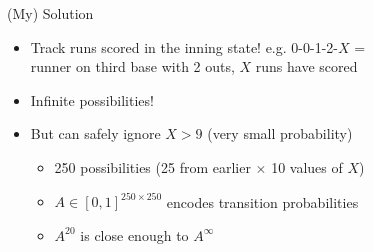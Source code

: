 \documentclass[handout]{beamer}
\begin{document}
\begin{frame}{(My) Solution}
  \begin{itemize}
    \item Track runs scored in the inning state! e.g. 0-0-1-2-$X$ =\\
      runner on third base with 2 outs, $X$ runs have scored
    \pause
    \item Infinite possibilities!
    \pause
    \item But can safely ignore $X > 9$ (very small probability)
    \pause
    \begin{itemize}
      \item 250 possibilities (25 from earlier $\times$ 10 values of $X$)
      \item $A \in [0, 1]^{250\times250}$ encodes transition probabilities
      \item $A^{20}$ is close enough to $A^\infty$
    \end{itemize}
  \end{itemize}
\end{frame}
\end{document}
